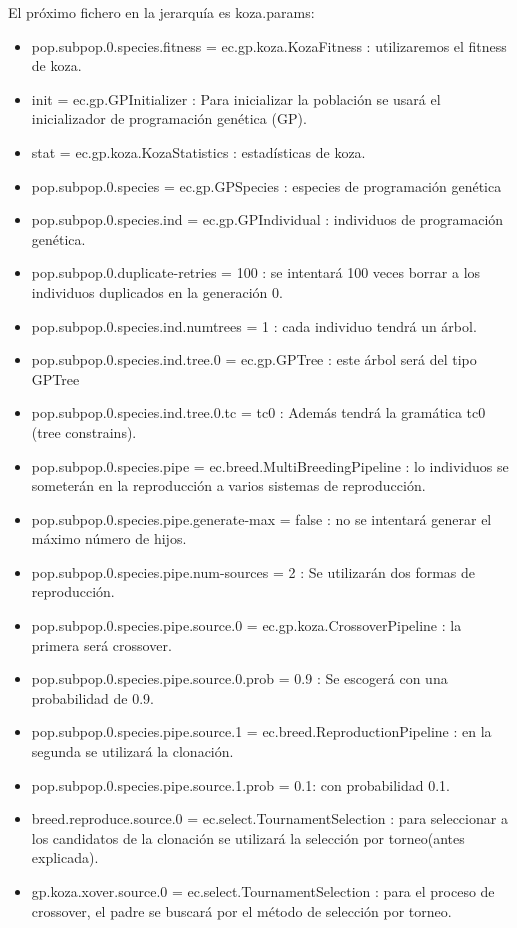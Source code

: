 El próximo fichero en la jerarquía es koza.params:

\begin{itemize}
\item	pop.subpop.0.species.fitness = ec.gp.koza.KozaFitness : utilizaremos el fitness de koza.
\item	init = ec.gp.GPInitializer : Para inicializar la población se usará el inicializador de programación genética (GP).
\item	stat = ec.gp.koza.KozaStatistics : estadísticas de koza.
\item	pop.subpop.0.species = ec.gp.GPSpecies : especies de programación genética
\item	pop.subpop.0.species.ind = ec.gp.GPIndividual : individuos de programación genética.
\item	pop.subpop.0.duplicate-retries = 100 : se intentará 100 veces borrar a los individuos duplicados en la generación 0.
\item	pop.subpop.0.species.ind.numtrees = 1 : cada individuo tendrá un árbol.
\item	pop.subpop.0.species.ind.tree.0 = ec.gp.GPTree : este árbol será del tipo GPTree
\item	pop.subpop.0.species.ind.tree.0.tc = tc0 : Además tendrá la gramática tc0 (tree constrains).
\item	pop.subpop.0.species.pipe = ec.breed.MultiBreedingPipeline : lo individuos se someterán en la reproducción a varios sistemas de reproducción.
\item	pop.subpop.0.species.pipe.generate-max = false : no se intentará generar el máximo número de hijos.
\item	pop.subpop.0.species.pipe.num-sources = 2 : Se utilizarán dos formas de reproducción.
\item	pop.subpop.0.species.pipe.source.0 = ec.gp.koza.CrossoverPipeline : la primera será crossover.
\item	pop.subpop.0.species.pipe.source.0.prob = 0.9 : Se escogerá con una probabilidad de 0.9.
\item	pop.subpop.0.species.pipe.source.1 = ec.breed.ReproductionPipeline : en la segunda se utilizará la clonación.
\item	pop.subpop.0.species.pipe.source.1.prob = 0.1: con probabilidad 0.1.
\item	breed.reproduce.source.0 = ec.select.TournamentSelection : para seleccionar a los candidatos de la clonación se utilizará la selección por torneo(antes explicada).
\item	gp.koza.xover.source.0 = ec.select.TournamentSelection : para el proceso de crossover, el padre se buscará por el método de selección por torneo.

\end{itemize}

